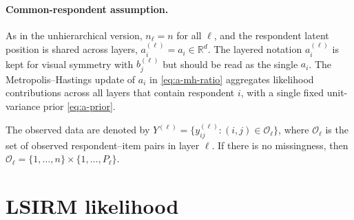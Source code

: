 \documentclass[11pt]{article}
\newcommand{\R}{\mathbb R}
\begin{document}
\paragraph{Common-respondent assumption.}
As in the unhierarchical version, $n_\ell=n$ for all $\ell$, and the
respondent latent position is shared across layers,
$a_i^{(\ell)}=a_i\in\R^d$.  The layered notation $a_i^{(\ell)}$ is kept
for visual symmetry with $b_j^{(\ell)}$ but should be read as the single
$a_i$.  The Metropolis--Hastings update of $a_i$ in
\eqref{eq:a-mh-ratio} aggregates likelihood contributions across all layers
that contain respondent $i$, with a single fixed unit-variance prior
\eqref{eq:a-prior}.

The observed data are denoted by
$Y^{(\ell)}=\{y_{ij}^{(\ell)}:(i,j)\in\mathcal O_\ell\}$, where
$\mathcal O_\ell$ is the set of observed respondent--item pairs in layer
$\ell$.  If there is no missingness, then
$\mathcal O_\ell=\{1,\dots,n\}\times\{1,\dots,P_\ell\}$.

\section{LSIRM likelihood}
\end{document}
